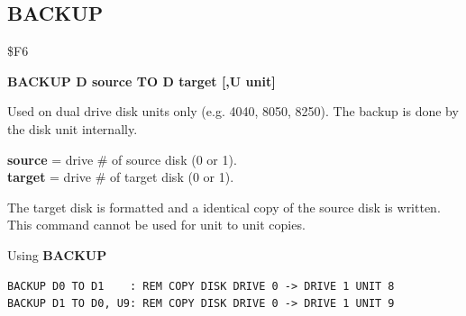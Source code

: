 
\newpage
\subsection{BACKUP}
\begin{description}[leftmargin=2cm,style=nextline]
\item [Token:] \$F6
\item [Format:] {\bf BACKUP D source TO D target [,U unit]}
\item [Usage:] Used on dual drive
   disk units only (e.g. 4040, 8050, 8250).
   The backup is done by the disk unit internally.

   {\bf source} = drive \# of source disk (0 or 1). \\
   {\bf target} = drive \# of target disk (0 or 1).

\item [Remarks:]  The target disk is formatted and
                 a identical copy of the source disk is written. \\
                 This command cannot be used for unit to unit copies.

\item [Example:] Using {\bf BACKUP}

\begin{tcolorbox}[colback=black,coltext=white]
\verbatimfont{\codefont}
\begin{verbatim}
BACKUP D0 TO D1    : REM COPY DISK DRIVE 0 -> DRIVE 1 UNIT 8
BACKUP D1 TO D0, U9: REM COPY DISK DRIVE 0 -> DRIVE 1 UNIT 9
\end{verbatim}
\end{tcolorbox}
\end{description}


\newpage

